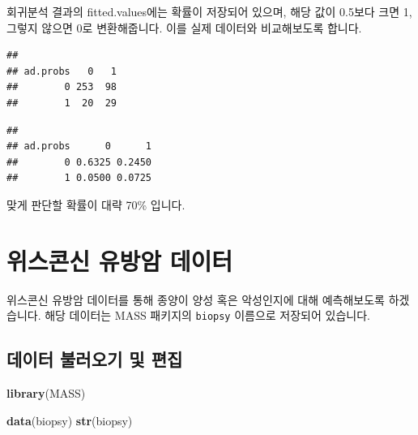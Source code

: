 \documentclass[12pt,]{book}
\newenvironment{Shaded}{\begin{snugshade}}{\end{snugshade}}
\newcommand{\KeywordTok}[1]{\textcolor[rgb]{0.13,0.29,0.53}{\textbf{#1}}}
\newcommand{\NormalTok}[1]{#1}
\newcommand{\OperatorTok}[1]{\textcolor[rgb]{0.81,0.36,0.00}{\textbf{#1}}}
\begin{document}
회귀분석 결과의 fitted.values에는 확률이 저장되어 있으며, 해당 값이 0.5보다 크면 1, 그렇지 않으면 0로 변환해줍니다. 이를 실제 데이터와 비교해보도록 합니다.

\begin{Shaded}
\end{Shaded}

\begin{verbatim}
##         
## ad.probs   0   1
##        0 253  98
##        1  20  29
\end{verbatim}

\begin{Shaded}
\end{Shaded}

\begin{verbatim}
##         
## ad.probs      0      1
##        0 0.6325 0.2450
##        1 0.0500 0.0725
\end{verbatim}

맞게 판단할 확률이 대략 70\% 입니다.

\hypertarget{uxc704uxc2a4uxcf58uxc2e0-uxc720uxbc29uxc554-uxb370uxc774uxd130}{%
\section{위스콘신 유방암 데이터}\label{uxc704uxc2a4uxcf58uxc2e0-uxc720uxbc29uxc554-uxb370uxc774uxd130}}

위스콘신 유방암 데이터를 통해 종양이 양성 혹은 악성인지에 대해 예측해보도록 하겠습니다. 해당 데이터는 MASS 패키지의 \texttt{biopsy} 이름으로 저장되어 있습니다.

\hypertarget{uxb370uxc774uxd130-uxbd88uxb7ecuxc624uxae30-uxbc0f-uxd3b8uxc9d1}{%
\subsection{데이터 불러오기 및 편집}\label{uxb370uxc774uxd130-uxbd88uxb7ecuxc624uxae30-uxbc0f-uxd3b8uxc9d1}}

\begin{Shaded}
\begin{Highlighting}[]
\KeywordTok{library}\NormalTok{(MASS)}

\KeywordTok{data}\NormalTok{(biopsy)}
\KeywordTok{str}\NormalTok{(biopsy)}
\end{Highlighting}
\end{Shaded}
\end{document}
